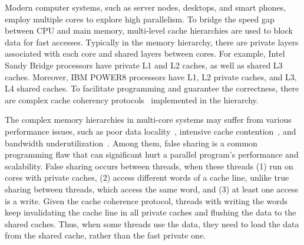 Modern computer systems, such as server nodes, desktops, and smart phones, employ multiple cores to explore high parallelism. To bridge the speed gap between CPU and main memory, multi-level cache hierarchies are used to block data for fast accesses. Typically in the memory hierarchy, there are private layers associated with each core and shared layers between cores. For example, Intel Sandy Bridge processors have private L1 and L2 caches, as well as shared L3 caches. Moreover, IBM POWER8 processors have L1, L2 private caches, and L3, L4 shared caches.
To facilitate programming and guarantee the correctness, there are complex cache coherency protocols~\cite{MESI} implemented in the hierarchy.

The complex memory hierarchies in multi-core systems may suffer from various performance issues, such as poor data locality~\cite{ibs-sc,ibs-ispass}, intensive cache contention~\cite{ibs-sc2}, and bandwidth underutilization~\cite{Dramon}. Among them, false sharing is a common programming flaw that can significant hurt a parallel program's performance and scalability. False sharing occurs between threads, when these threads (1) run on cores with private caches, (2) access different words of a cache line, unlike true sharing between threads, which access the same word, and (3) at least one access is a write. Given the cache coherence protocol, threads with writing the words keep invalidating the cache line in all private caches and flushing the data to the shared caches. Thus, when some threads use the data, they need to load the data from the shared cache, rather than the fast private one.




